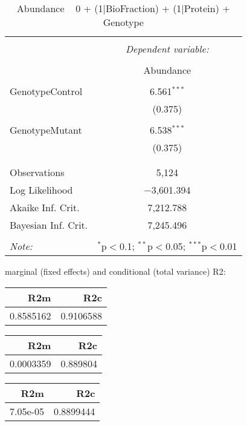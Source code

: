 \documentclass[11pt]{report}
\begin{document}
\begin{table}[!htbp] \centering 
  \caption{Abundance ~ 0 + (1|BioFraction) + (1|Protein) + Genotype} 
  \label{} 
\begin{tabular}{@{\extracolsep{5pt}}lc} 
\\[-1.8ex]\hline 
\hline \\[-1.8ex] 
 & \multicolumn{1}{c}{\textit{Dependent variable:}} \\ 
\cline{2-2} 
\\[-1.8ex] & Abundance \\ 
\hline \\[-1.8ex] 
 GenotypeControl & 6.561$^{***}$ \\ 
  & (0.375) \\ 
  & \\ 
 GenotypeMutant & 6.538$^{***}$ \\ 
  & (0.375) \\ 
  & \\ 
\hline \\[-1.8ex] 
Observations & 5,124 \\ 
Log Likelihood & $-$3,601.394 \\ 
Akaike Inf. Crit. & 7,212.788 \\ 
Bayesian Inf. Crit. & 7,245.496 \\ 
\hline 
\hline \\[-1.8ex] 
\textit{Note:}  & \multicolumn{1}{r}{$^{*}$p$<$0.1; $^{**}$p$<$0.05; $^{***}$p$<$0.01} \\ 
\end{tabular} 
\end{table} 
marginal (fixed effects) and conditional (total variance) R2:

\begin{tabular}{r|r}
\hline
R2m & R2c\\
\hline
0.8585162 & 0.9106588\\
\hline
\end{tabular}

\begin{tabular}{r|r}
\hline
R2m & R2c\\
\hline
0.0003359 & 0.889804\\
\hline
\end{tabular}

\begin{tabular}{r|r}
\hline
R2m & R2c\\
\hline
7.05e-05 & 0.8899444\\
\hline
\end{tabular}
\end{document}
